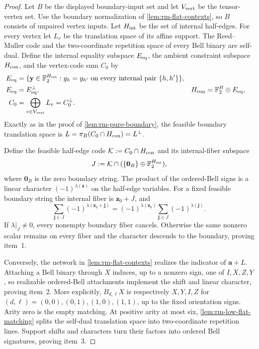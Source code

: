 \documentclass[11pt,letterpaper,onecolumn]{article}
\theoremstyle{plain}
\theoremstyle{definition}
\theoremstyle{remark}
\newcommand{\Ftwo}{\mathbb F_2}
\begin{document}
\begin{proof}
Let \(B\) be the displayed boundary-input set and let
\(V_{\rm vert}\) be the tensor-vertex set.  Use the boundary normalization of \cref{lem:rm-flat-contexts},
so \(B\) consists of unpaired vertex inputs.  Let \(H_{\rm int}\) be the set of internal half-edges.  For every
vertex let \(L_v\) be the translation space of its affine support.  The
Reed--Muller code and the two-coordinate repetition space of every
Bell binary are self-dual.  Define the internal equality subspace
\(E_{\rm eq}\), the ambient
constraint subspace \(H_{\rm con}\), and the vertex-code sum \(C_0\) by
\[
 \begin{aligned}
 E_{\rm eq}
   &=\{{\mathbf{y}}\in\Ftwo^{H_{\rm int}}:
       y_h=y_{h'}\text{ on every internal pair }\{h,h'\}\},\\
 E_{\rm eq}&=E_{\rm eq}^\perp,
 &H_{\rm con}&=\Ftwo^B\oplus E_{\rm eq},\\
 C_0&=\bigoplus_{v\in V_{\rm vert}}L_v=C_0^\perp.
 \end{aligned}
\]
Exactly as in the proof of \cref{lem:rm-pure-boundary}, the feasible boundary
translation space is
\(L=\pi_B(C_0\cap H_{\rm con})=L^\perp\).

Define the feasible half-edge code
\(\mathcal K:=C_0\cap H_{\rm con}\) and its
internal-fiber subspace
\[
 J:=\mathcal K\cap
   (\{\mathbf 0_B\}\oplus\Ftwo^{H_{\rm int}}),
\]
where \(\mathbf 0_B\) is the zero boundary string.
The product of the ordered-Bell signs is a linear character
\((-1)^{\lambda({\mathbf{z}})}\) on the half-edge variables.  For a fixed feasible
boundary string the internal fiber is \({\mathbf{z}}_0+J\), and
\[
 \sum_{{\mathbf{j}}\in J}(-1)^{\lambda({\mathbf{z}}_0+{\mathbf{j}})}
 =(-1)^{\lambda({\mathbf{z}}_0)}\sum_{{\mathbf{j}}\in J}(-1)^{\lambda({\mathbf{j}})}.
\]
If \(\lambda|_J\ne0\), every nonempty boundary fiber cancels. Otherwise
the same nonzero scalar remains on every fiber and the character descends
to the boundary, proving item~1.

Conversely, the network in \cref{lem:rm-flat-contexts}
realizes the indicator of \({\mathbf{a}}+L\).  Attaching a Bell binary through \(X\)
induces, up to a nonzero sign, one of \(I,X,Z,Y\), so realizable ordered-Bell
attachments implement
  the shift and linear character, proving item~2.  More explicitly,
  \(B_{d,\ell}X\) is respectively \(X,Y,I,Z\) for
  \((d,\ell)=(0,0),(0,1),(1,0),(1,1)\), up to the fixed orientation signs.
Arity zero is the empty matching.  At positive arity at most six,
\cref{lem:rm-low-flat-matching} splits the self-dual translation space into
two-coordinate repetition lines.  Support shifts and characters turn
their factors into ordered Bell signatures, proving item~3.


\end{proof}
\end{document}
